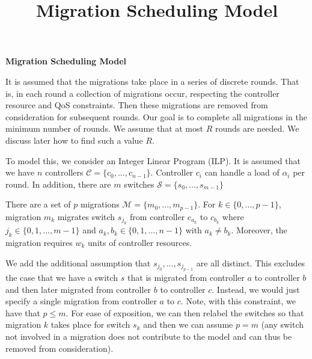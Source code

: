 \documentclass[letterpaper,12pt,titlepage,oneside,final]{article}
\title{Migration Scheduling Model}
\let\oldcenter\center
\let\oldendcenter\endcenter
\renewenvironment{center}{\setlength\topsep{0pt}\oldcenter}{\oldendcenter}
\begin{document}
\pagestyle{empty}


\pagestyle{plain}

\newpage %

\cleardoublepage

\newpage

\begin{center}
    \Huge{\bf Migration Scheduling Model}
\end{center}

\noindent It is assumed that the migrations take place in a series of discrete rounds. That is, in each round a collection of migrations occur, respecting the controller resource and QoS constraints. Then these migrations are removed from consideration for subsequent rounds. Our goal is to complete all migrations in the minimum number of rounds. We assume that at most $R$ rounds are needed. We discuss later how to find such a value $R$.

To model this, we consider an Integer Linear Program (ILP). It is assumed that we have $n$ controllers $\mathcal{C} = \{c_{0}, ..., c_{n-1}\}$. Controller $c_{i}$ can handle a load of $\alpha_{i}$ per round. In addition, there are $m$ switches $\mathcal{S} = \{s_{0}, ..., s_{m-1}\}$

There are a set of $p$ migrations $\mathcal{M} = \{m_{0}, ..., m_{p-1}\}$. For $k \in \{0, ..., p-1\}$, migration $m_{k}$ migrates switch $s_{j_{k}}$ from controller $c_{a_{k}}$ to $c_{b_{k}}$ where $j_{k} \in \{0, 1, ..., m - 1\}$ and $a_{k}, b_{k} \in \{0, 1, ..., n - 1\}$ with $a_{k} \neq b_{k}$. Moreover, the migration requires $w_{k}$ units of controller resources. 

We add the additional assumption that $s_{j_{0}}, ..., s_{j_{p-1}}$ are all distinct. This excludes the case that we have a switch $s$ that is migrated from controller $a$ to controller $b$ and then later migrated from controller $b$ to controller $c$. Instead, we would just specify a single migration from controller $a$ to $c$. Note, with this constraint, we have that $p \leq m$. For ease of exposition, we can then relabel the switches so that migration $k$ takes place for switch $s_{k}$ and then we can assume $p = m$ (any switch not involved in a migration does not contribute to the model and can thus be removed from consideration).
\end{document}

